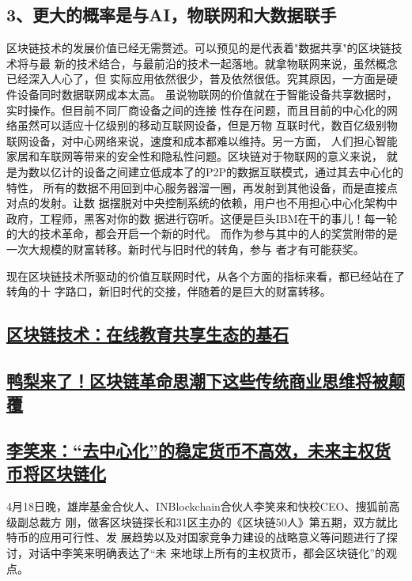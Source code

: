 \documentclass[11pt]{ctexart}
\begin{document}
\subsection{3、更大的概率是与AI，物联网和大数据联手}
\label{sec:orgdf9a940}

区块链技术的发展价值已经无需赘述。可以预见的是代表着"数据共享"的区块链技术将与最
新的技术结合，与最前沿的技术一起落地。就拿物联网来说，虽然概念已经深入人心了，但
实际应用依然很少，普及依然很低。究其原因，一方面是硬件设备同时数据联网成本太高。
虽说物联网的价值就在于智能设备共享数据时，实时操作。但目前不同厂商设备之间的连接
性存在问题，而且目前的中心化的网络虽然可以适应十亿级别的移动互联网设备，但是万物
互联时代，数百亿级别物联网设备，对中心网络来说，速度和成本都难以维持。另一方面，
人们担心智能家居和车联网等带来的安全性和隐私性问题。区块链对于物联网的意义来说，
就是为数以亿计的设备之间建立低成本了的P2P的数据互联模式，通过其去中心化的特性，
所有的数据不用回到中心服务器溜一圈，再发射到其他设备，而是直接点对点的发射。让数
据摆脱对中央控制系统的依赖，用户也不用担心中心化架构中政府，工程师，黑客对你的数
据进行窃听。这便是巨头IBM在干的事儿！每一轮的大的技术革命，都会开启一个新的时代。
而作为参与其中的人的奖赏附带的是一次大规模的财富转移。新时代与旧时代的转角，参与
者才有可能获奖。

现在区块链技术所驱动的价值互联网时代，从各个方面的指标来看，都已经站在了转角的十
字路口，新旧时代的交接，伴随着的是巨大的财富转移。
\subsection{\href{http://www.sohu.com/a/228937573\_204078}{区块链技术：在线教育共享生态的基石}}
\label{sec:org8783aac}
\subsection{\href{http://www.sohu.com/a/228894330\_182338}{鸭梨来了！区块链革命思潮下这些传统商业思维将被颠覆}}
\label{sec:org9479982}
\subsection{\href{http://www.sohu.com/a/228903451\_251558}{李笑来：“去中心化”的稳定货币不高效，未来主权货币将区块链化}}
\label{sec:orgc3c55b6}
4月18日晚，雄岸基金合伙人、INBlockchain合伙人李笑来和快校CEO、搜狐前高级副总裁方
刚，做客区块链探长和31区主办的《区块链50人》第五期，双方就比特币的应用可行性、发
展趋势以及对国家竞争力建设的战略意义等问题进行了探讨，对话中李笑来明确表达了“未
来地球上所有的主权货币，都会区块链化”的观点。
\end{document}
